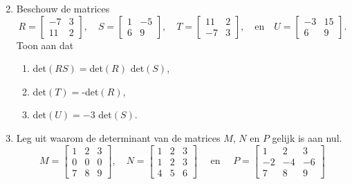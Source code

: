 \begin{enumerate}
\begin{multicols}{3}
\begin{enumerate}
\end{enumerate}
\end{multicols}

\item Beschouw de matrices
\[ R=\begin{bmatrix}
-7 & 3 \\ 11 & 2
\end{bmatrix}, \quad S=\begin{bmatrix}
1 & -5 \\ 6 & 9
\end{bmatrix}, \quad T = \begin{bmatrix}
11 & 2 \\ -7 & 3
\end{bmatrix}, \quad \text{en} \quad U = \begin{bmatrix}
-3 & 15 \\ 6 & 9
\end{bmatrix}.  \]
Toon aan dat 
\begin{enumerate}
	\item det$(RS) = $det$(R)$ det$(S)$,
	\item det$(T) = $-det$(R)$,
	\item det$(U) = -3$ det$(S)$.
\end{enumerate}

\item Leg uit waarom de determinant van de matrices $M$, $N$ en $P$ gelijk is aan nul.
\[M=\begin{bmatrix}
1 & 2 & 3 \\ 0 & 0 & 0 \\ 7 & 8 & 9
\end{bmatrix}, \quad N=\begin{bmatrix}
1 & 2 & 3 \\ 1 & 2 & 3 \\ 4 &5 & 6
\end{bmatrix} \quad \text{ en } \quad P = \begin{bmatrix}
1 & 2 & 3 \\ -2 & -4 & -6\\ 7 & 8 & 9
\end{bmatrix}  \]



\end{enumerate}
